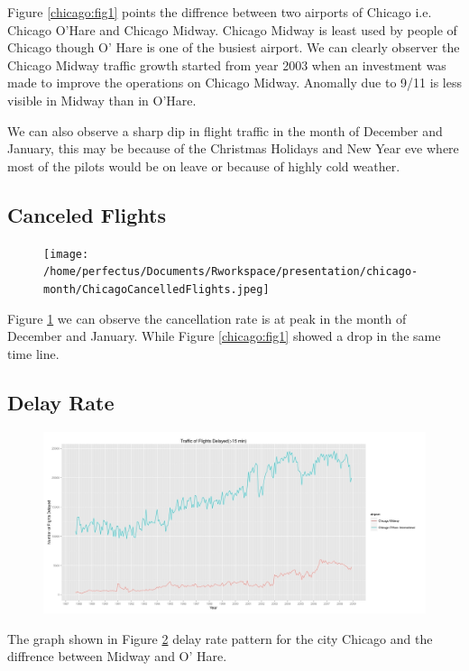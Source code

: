 Figure \ref{chicago:fig1} points the diffrence between two airports of Chicago i.e. Chicago O'Hare and Chicago Midway. Chicago Midway is least used by people of Chicago though O' Hare is one of the busiest airport. We can clearly observer the Chicago Midway traffic growth started from year 2003 when an investment was made to improve the operations on Chicago Midway. Anomally due to 9/11 is less visible in Midway than in O'Hare. 

We can also observe a sharp dip in flight traffic in the month of December and January, this may be because of the Christmas Holidays and New Year eve where most of the pilots would be on leave or because of highly cold weather. 
\subsection{Canceled Flights}
\begin{figure}[htp]
\centering
\texttt{[image: /home/perfectus/Documents/Rworkspace/presentation/chicago-month/ChicagoCancelledFlights.jpeg]}
\caption{}
\label{chicago:fig2}
\end{figure}
Figure \ref{chicago:fig2} we can observe the cancellation rate is at peak in the month of December and January. While Figure \ref{chicago:fig1} showed a drop in the same time line.

\subsection{Delay Rate}
\begin{figure}[htp]
\centering
\includegraphics[scale=0.4]{Figures/fig-7.jpeg}
\caption{}
\label{chicago:fig3}
\end{figure}
The graph shown in Figure \ref{chicago:fig3} delay rate pattern for the city Chicago and the diffrence between Midway and O' Hare.

